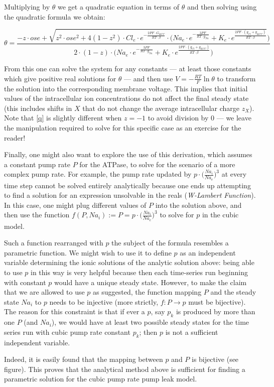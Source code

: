 \documentclass[a4paper,11pt]{article}
\begin{document}
Multiplying by $\theta$ we get a quadratic equation in terms of $\theta$ and then solving using the quadratic formula we obtain:

\begin{scriptsize}
\begin{equation} \label{q}
\theta=\frac{-z \cdot ose+\sqrt{z^2 \cdot ose^2+4(1-z^2)\cdot Cl_e \cdot e^{-\frac{2PF\cdot G_{KCC}}{ RT\cdot \beta}}\cdot\Big(Na_e \cdot e^{-\frac{3PF}{RT\cdot g_{Na}}}+K_e\cdot e^{\frac{2 P F \cdot (g_{Cl}+ g_{KCC})}{RT \cdot \beta}}}\Big)}{2\cdot(1-z)\cdot\Big(Na_e \cdot e^{-\frac{3PF}{RT\cdot g_{Na}}}+K_e\cdot e^{\frac{2 P F \cdot (g_{Cl}+ g_{KCC})}{RT \cdot \beta}}\Big)}    
\end{equation}

\end{scriptsize}

From this one can solve the system for any constants --- at least those constants which give positive real solutions for $\theta$ --- and then use $V=-\frac{RT}{F}\ln{\theta}$ to transform the solution into the corresponding membrane voltage. This implies that initial values of the intracellular ion concentrations do not affect the final steady state (this includes shifts in $X$ that do not change the average intracellular charge $z_X$). Note that \eqref{q} is slightly different when $z=-1$ to avoid division by 0 --- we leave the manipulation required to solve for this specific case as an exercise for the reader!

Finally, one might also want to explore the use of this derivation, which assumes a constant pump rate $P$ for the ATPase, to solve for the scenario of a more complex pump rate. For example, the pump rate updated by $p\cdot\Big(\frac{Na_i}{Na_e}\Big)^3$ at every time step cannot be solved entirely analytically because one ends up attempting to find a solution for an expression unsolvable in the reals (\emph{W-Lambert Function}). In this case, one might plug different values of $P$ into the solution above, and then use the function $f(P, Na_i) := P=p\cdot\Big(\frac{Na_i}{Na_e}\Big)^3$ to solve for $p$ in the cubic model.

Such a function rearranged with $p$ the subject of the formula resembles a parametric function. We might wish to use it to define $p$ as an independent variable determining the ionic solutions of the analytic solution above: being able to use $p$ in this way is very helpful because then each time-series run beginning with constant $p$ would have a unique steady state. However, to make the claim that we are allowed to use $p$ as suggested, the function mapping $P$ and the steady state $Na_i$ to $p$ needs to be injective (more strictly, $f: P\rightarrow p$ must be bijective). The reason for this constraint is that if ever a $p$, say $p_k$ is produced by more than one $P$ (and $Na_i$), we would have at least two possible steady states for the time series run with cubic pump rate constant $p_k$; then $p$ is not a sufficient independent variable.

Indeed, it is easily found that the mapping between $p$ and $P$ is bijective (see figure). This proves that the analytical method above is sufficient for finding a parametric solution for the cubic pump rate pump leak model.
\end{document}
